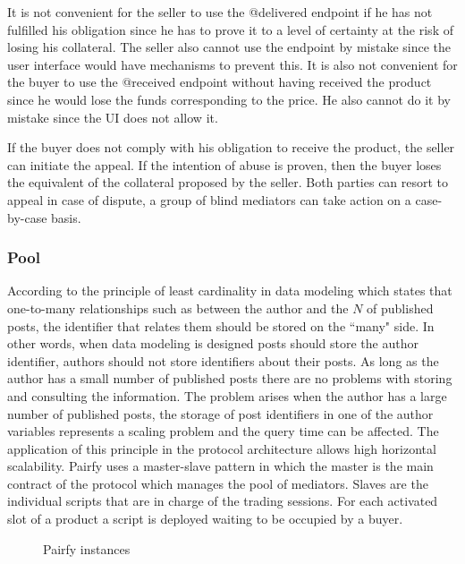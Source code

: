 \documentclass[12pt]{article}
\begin{document}
It is not convenient for the seller to use the @delivered endpoint if he has not fulfilled his obligation since he has to prove it to a level of certainty at the risk of losing his collateral. The seller also cannot use the endpoint by mistake since the user interface would have mechanisms to prevent this. It is also not convenient for the buyer to use the @received endpoint without having received the product since he would lose the funds corresponding to the price. He also cannot do it by mistake since the UI does not allow it.

If the buyer does not comply with his obligation to receive the product, the seller can initiate the appeal. If the intention of abuse is proven, then the buyer loses the equivalent of the collateral proposed by the seller. Both parties can resort to appeal in case of dispute, a group of blind mediators can take action on a case-by-case basis.

\subsubsection { Pool } 

According to the principle of least cardinality in data modeling which states that one-to-many relationships such as between the author and the $N$ of published posts, the identifier that relates them should be stored on the ``many" side. In other words, when data modeling is designed posts should store the author identifier, authors should not store identifiers about their posts. As long as the author has a small number of published posts there are no problems with storing and consulting the information. The problem arises when the author has a large number of published posts, the storage of post identifiers in one of the author variables represents a scaling problem and the query time can be affected.
The application of this principle in the protocol architecture allows high horizontal scalability.
Pairfy uses a master-slave pattern in which the master is the main contract of the protocol which manages the pool of mediators.
Slaves are the individual scripts that are in charge of the trading sessions. For each activated slot of a product a script is deployed waiting to be occupied by a buyer.


\begin{figure}[ht]
  \centering
  
  \caption{Pairfy instances}
  \label{fig:delivered}
\end{figure}
\end{document}
